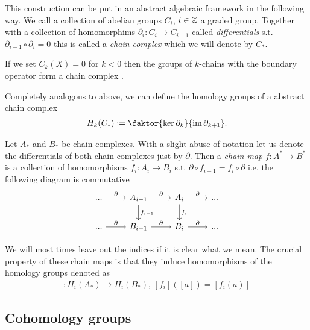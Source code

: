\documentclass[../main.tex]{subfiles}
\begin{document}
This construction can be put in an abstract algebraic framework in the following 
way. We call a collection of abelian groups $C_i$, $i\in \mathbb{Z}$ a graded group.                                                   
Together with a collection of homomorphims $\partial_i: C_i \rightarrow C_{i-1}$ 
called \textit{differentials}
s.t. $\partial_{i-1} \circ \partial_i = 0$ this is called a \textit{chain complex} which 
we will denote by $C_*$. 

\begin{example}
    If we set $C_k(X) = {0}$ for $k < 0$ then the groups of $k$-chains with 
    the boundary operator form a chain complex . 
\end{example}

Completely analogous to above, we can define the homology groups 
of a abstract chain complex
\begin{align*}
    H_k(C_*) \vcentcolon= \faktor{\ker \partial_k}{\Ima \partial_{k+1}}.
\end{align*}

\begin{definition}
    Let $A_*$ and $B_*$ be chain complexes. With a slight abuse of notation
    let us denote the differentials of 
    both chain complexes just by $\partial$.
    Then a \textit{chain map} $f: A^* \rightarrow B^*$ is a collection 
    of homomorphisms $f_i: A_i \rightarrow B_i$ s.t. 
    $\partial \circ f_{i-1} = f_i \circ \partial$ i.e. the following diagram is commutative
    \begin{equation*}
        \begin{tikzcd}
            ... \arrow[r, "\partial"] 
                & A_{i-1} \arrow[r, "\partial"] \arrow[d, "f_{i-1}"] & A_i \arrow[r, "\partial"] \arrow[d, "f_i"] 
                & ...\\
            ... \arrow[r, "\partial"] 
                & B_{i-1} \arrow[r, "\partial"] & B_i \arrow[r, "\partial"] 
                & ...
        \end{tikzcd}
    \end{equation*}
\end{definition}
We will most times leave out the 
indices if it is clear what we mean.
The crucial property of these chain maps is that they induce homomorphisms of
the homology groups denoted as
\begin{align*}
    [f_i]: H_i(A_*) \rightarrow H_i(B_*), \, [f_i]([a]) = [f_i(a)]
\end{align*}

\subsection{Cohomology groups}
\end{document}
